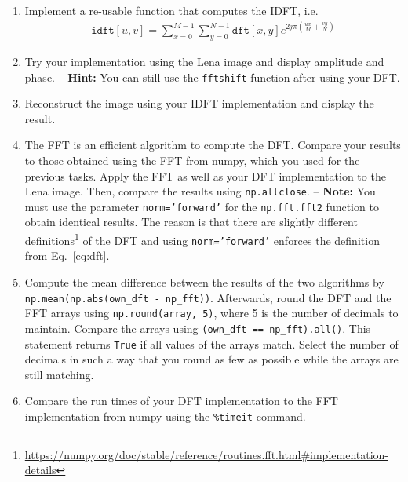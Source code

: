 \documentclass[12pt,a4paper]{article}
\begin{document}
\begin{enumerate}
\begin{samepage}
\begin{enumerate}
    \item Implement a re-usable function that computes the IDFT, i.e.
    \begin{gather}
        \texttt{idft}[u, v] = \sum_{x=0}^{M-1} \sum_{y=0}^{N-1} \texttt{dft}[x, y] e^{2j\pi (\frac{ux}{M}+\frac{vy}{N})}
    \end{gather}
    \item Try your implementation using the Lena image and display amplitude and phase. -- \textbf{Hint:} You can still use the \texttt{fftshift} function after using your DFT.
    \item Reconstruct the image using your IDFT implementation and display the result.
    \item The FFT is an efficient algorithm to compute the DFT. Compare your results to those obtained using the FFT from numpy, which you used for the previous tasks. Apply the FFT as well as your DFT implementation to the Lena image. Then, compare the results using \texttt{np.allclose}. -- \textbf{Note:} You must use the parameter \texttt{norm='forward'} for the \texttt{np.fft.fft2} function to obtain identical results. The reason is that there are slightly different definitions\footnote{\url{https://numpy.org/doc/stable/reference/routines.fft.html\#implementation-details}} of the DFT and using \texttt{norm='forward'} enforces the definition from Eq.~\eqref{eq:dft}.
    \item Compute the mean difference between the results of the two algorithms by \texttt{np.mean(np.abs(own\_dft - np\_fft))}. Afterwards, round the DFT and the FFT arrays using \texttt{np.round(array, 5)}, where 5 is the number of decimals to maintain.
    Compare the arrays using \texttt{(own\_dft == np\_fft).all()}. This statement returns \texttt{True} if all values of the arrays match. Select the number of decimals in such a way that you round as few as possible while the arrays are still matching.
    \item Compare the run times of your DFT implementation to the FFT implementation from numpy using the \texttt{\%timeit} command.
\end{enumerate}
\end{samepage}
\end{enumerate}
\end{document}
